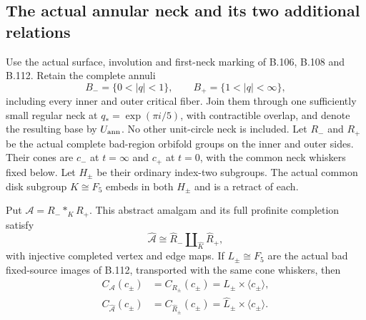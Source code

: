 \subsection*{The actual annular neck and its two additional relations}

\label{stmt:B114}
Use the actual surface, involution and first-neck marking of B.106,
B.108 and B.112. Retain the complete annuli
\[
 B_-=\{0<|q|<1\},\qquad B_+=\{1<|q|<\infty\},
\]
including every inner and outer critical fiber. Join them through
one sufficiently small regular neck at $q_*=\exp(\pi i/5)$, with
contractible overlap, and denote the resulting base by $U_{\rm ann}$.
No other unit-circle neck is included. Let $R_-$ and $R_+$ be the
actual complete bad-region orbifold groups on the inner and outer
sides. Their cones are $c_-$ at $t=\infty$ and $c_+$ at $t=0$,
with the common neck whiskers fixed below. Let $H_\pm$ be their
ordinary index-two subgroups. The actual common disk subgroup
$K\cong F_5$ embeds in both $H_\pm$ and is a retract of each.

Put $\mathcal A=R_-*_{K}R_+$. This abstract amalgam and its full
profinite completion satisfy
\begin{equation}\label{eq:B114-proper}
 \widehat{\mathcal A}\cong
 \widehat R_-\amalg_{\widehat K}\widehat R_+,
\end{equation}
with injective completed vertex and edge maps. If $L_\pm\cong F_5$
are the actual bad fixed-source images of B.112, transported with
the same cone whiskers, then
\begin{equation}\label{eq:B114-abstract-centralizers}
 \begin{aligned}
 C_{\mathcal A}(c_\pm)&=C_{R_\pm}(c_\pm)
                         =L_\pm\times\langle c_\pm\rangle,\\
 C_{\widehat{\mathcal A}}(c_\pm)
     &=C_{\widehat R_\pm}(c_\pm)
                         =\widehat L_\pm\times\langle c_\pm\rangle.
 \end{aligned}
\end{equation}

